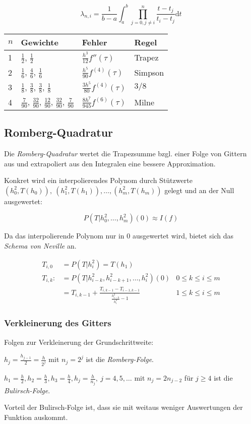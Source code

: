 \vspace*{-2mm}
$$\lambda_{n,i} = \frac{1}{b-a} \int_a^b \prod_{j=0,j\neq i}^n \frac{t-t_j}{t_i-t_j} \text{d}t$$

{
	\def\arraystretch{1.6}
	\begin{tabular}{ l | l | l | l }
	$n$ & Gewichte & Fehler & Regel \\
	\hline
	1 & $\frac{1}{2}$, $\frac{1}{2}$ & $\frac{h^3}{12}f''(\tau)$ & Trapez \\
	2 & $\frac{1}{6}$, $\frac{4}{6}$, $\frac{1}{6}$ & $\frac{h^5}{90}f^{(4)}(\tau)$ & Simpson \\
	3 & $\frac{1}{8}$, $\frac{3}{8}$, $\frac{3}{8}$, $\frac{1}{8}$ & $\frac{3h^5}{80}f^{(4)}(\tau)$ & $3/8$ \\
	4 & $\frac{7}{90}$, $\frac{32}{90}$, $\frac{12}{90}$, $\frac{32}{90}$, $\frac{7}{90}$ & $\frac{8h^7}{945}f^{(6)}(\tau)$ & Milne
	\end{tabular}
}

\subsection*{Romberg-Quadratur}

Die \emph{Romberg-Quadratur} wertet die Trapezsumme bzgl. einer Folge von Gittern aus und extrapoliert aus den Integralen eine bessere Approximation.

\spacing

Konkret wird ein interpolierendes Polynom durch Stützwerte $(h_0^2,T(h_0)),\ (h_1^2,T(h_1)),\dots,(h_m^2,T(h_m))$ gelegt und an der Null ausgewertet:

\vspace*{-2mm}
$$P(T|h_0^2,\dots,h_m^2)(0) \approx I(f)$$

Da das interpolierende Polynom nur in $0$ ausgewertet wird, bietet sich das \emph{Schema von Neville} an.

\vspace*{-4mm}
\begin{align*}
T_{i,0} &= P(T|h_i^2) = T(h_1) \\
T_{i,k} :&= P(T|h_{i-k}^2,h_{i-k+1}^2,\dots,h_i^2)(0) &0 \leq k \leq i \leq m \\
&= T_{i,k-1} + \frac{T_{i,k-1}-T_{i-1,k-1}}{\frac{h_{i-k}^2}{h_i^2}-1} &1\leq k\leq i\leq m
\end{align*}

\subsubsection*{Verkleinerung des Gitters}

Folgen zur Verkleinerung der Grundschrittweite:

$h_j = \frac{h_{j-1}}{2} = \frac{h}{2^j}$ mit $n_j = 2^j$ ist die \emph{Romberg-Folge}.

\vspace*{1mm}

$h_1 = \frac{h}{2},h_2=\frac{h}{3},h_3=\frac{h}{4},h_j=\frac{h}{n_j},\ j=4,5,\dots$ mit $n_j = 2n_{j-2}$ für $j \geq 4$ ist die \emph{Bulirsch-Folge}.

\vspace*{1mm}

Vorteil der Bulirsch-Folge ist, dass sie mit weitaus weniger Auswertungen der Funktion auskommt.
